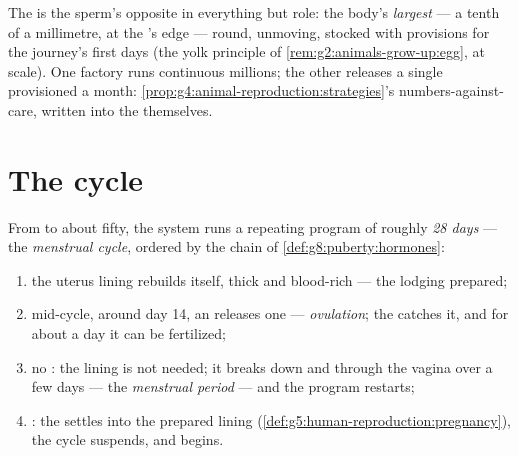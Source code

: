 \begin{example}\label{ex:g8:reproductive-systems:egg}
The  is the sperm's opposite in everything but
role: the body's \emph{largest}  --- a tenth of a
millimetre, at the 's edge --- round, unmoving,
stocked with provisions for the journey's first days
(the yolk principle of \cref{rem:g2:animals-grow-up:egg},
at  scale). One factory runs continuous millions; the
other releases a single provisioned  a month:
\cref{prop:g4:animal-reproduction:strategies}'s
numbers-against-care, written into the 
themselves.
\end{example}

\section{The cycle}

\begin{proposition}\label{prop:g8:reproductive-systems:cycle}
From  to about fifty, the  system runs a
repeating program of roughly \emph{28 days} --- the
\emph{menstrual cycle}, ordered by
the  chain of \cref{def:g8:puberty:hormones}:
\begin{enumerate}
  \item the uterus lining rebuilds itself, thick and
        blood-rich --- the lodging prepared;
  \item mid-cycle, around day 14, an  releases one
         --- \emph{ovulation};
        the  catches it, and for about a day it can
        be fertilized;
  \item no : the lining is not needed; it
        breaks down and  through the vagina over a
        few days --- the \emph{menstrual
        period} --- and the
        program restarts;
  \item {}: the  settles into the
        prepared lining
        (\cref{def:g5:human-reproduction:pregnancy}), the
        cycle suspends, and  begins.
\end{enumerate}
\end{proposition}
\admitted

